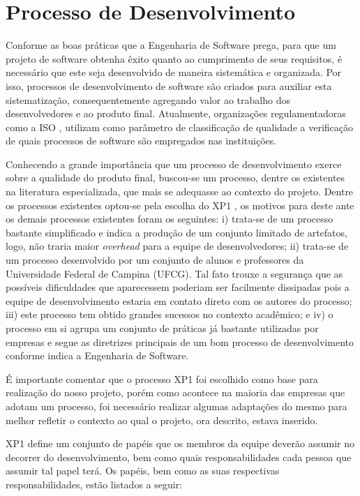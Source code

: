 \chapter{Processo de Desenvolvimento}

Conforme as boas práticas que a Engenharia de Software prega, para que um projeto de software obtenha êxito quanto ao cumprimento de seus requisitos, é necessário que este seja desenvolvido de maneira sistemática e organizada. Por isso, processos de desenvolvimento de software são criados para auxiliar esta sistematização, consequentemente agregando valor ao trabalho dos desenvolvedores e ao produto final. Atualmente, organizações regulamentadoras como a ISO \cite{iso}, utilizam como parâmetro de classificação de qualidade a verificação de quais processos de software são empregados nas instituições.

Conhecendo a grande importância que um processo de desenvolvimento exerce sobre a qual\-idade do produto final, buscou-se um processo, dentre os existentes na literatura especializada, que mais se adequasse ao contexto do projeto. Dentre os processos existentes optou-se pela escolha do XP1 \cite{xp1}, os motivos para deste ante os demais processos existentes foram os seguintes: i) trata-se de um processo bastante simplificado e indica a produção de um conjunto limitado de artefatos, logo, não traria maior \textit{overhead} para a equipe de desenvolvedores; ii) trata-se de um processo desenvolvido por um conjunto de alunos e professores da Universidade Federal de Campina (UFCG). Tal fato trouxe a segurança que as possíveis dificuldades que aparecessem poderiam ser facilmente dissipadas pois a equipe de desenvolvimento estaria em contato direto com os autores do processo; iii) este processo tem obtido grandes sucessos no contexto acadêmico; e iv) o processo em si agrupa um conjunto de práticas já bastante utilizadas por empresas e segue as diretrizes principais de um bom processo de desenvolvimento conforme indica a Engenharia de Software.

É importante comentar que o processo XP1 foi escolhido como base para realização do nosso projeto, porém como acontece na maioria das empresas que adotam um processo, foi necessário realizar algumas adaptações do mesmo para melhor refletir o contexto ao qual o projeto, ora descrito, estava inserido.

XP1 define um conjunto de papéis que os membros da equipe deverão assumir no decorrer do desenvolvimento, bem como quais responsabilidades cada pessoa que assumir tal papel terá. Os papéis, bem como as suas respectivas responsabilidades, estão listados a seguir: \\

